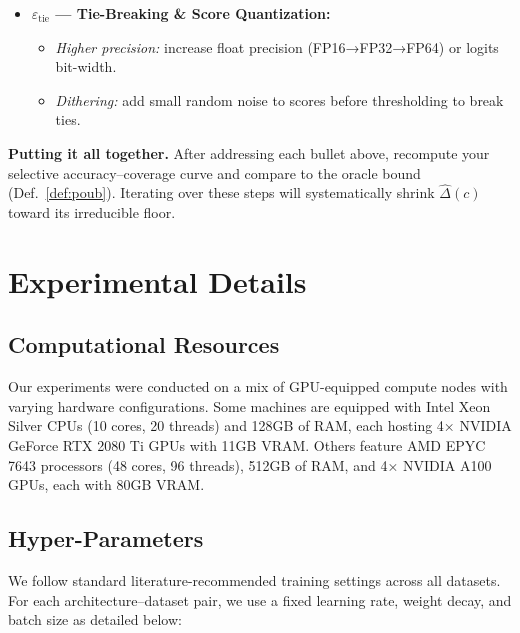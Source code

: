 \begin{itemize}[leftmargin=1.5em]
  \item \textbf{\(\varepsilon_{\text{tie}}\) — Tie-Breaking \& Score Quantization:}
    \begin{itemize}[leftmargin=1.25em]
      \item \emph{Higher precision:} increase float precision (FP16→FP32→FP64) or logits bit-width.
      \item \emph{Dithering:} add small random noise to scores before thresholding to break ties.
    \end{itemize}

\end{itemize}

\noindent\textbf{Putting it all together.}  
After addressing each bullet above, recompute your selective accuracy–coverage curve and compare to the oracle bound (Def.~\ref{def:poub}).  Iterating over these steps will systematically shrink \(\widehat\Delta(c)\) toward its irreducible floor.


\section{Experimental Details}
\label{sec:exp_det}

\subsection{Computational Resources}
\label{app:comp_res}

Our experiments were conducted on a mix of GPU-equipped compute nodes with varying hardware configurations. Some machines are equipped with Intel Xeon Silver CPUs (10 cores, 20 threads) and 128GB of RAM, each hosting 4× NVIDIA GeForce RTX 2080 Ti GPUs with 11GB VRAM. Others feature AMD EPYC 7643 processors (48 cores, 96 threads), 512GB of RAM, and 4× NVIDIA A100 GPUs, each with 80GB VRAM.

\subsection{Hyper-Parameters}
\label{app:hyperparams}

We follow standard literature-recommended training settings across all datasets. For each architecture–dataset pair, we use a fixed learning rate, weight decay, and batch size as detailed below:

